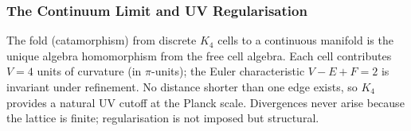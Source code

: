 \documentclass[11pt,a4paper]{book}
\begin{document}
\subsubsection*{The Continuum Limit and UV Regularisation}

The fold (catamorphism) from discrete $K_4$ cells to a continuous manifold
is the unique algebra homomorphism from the free cell algebra.  Each cell
contributes $V = 4$ units of curvature (in $\pi$-units); the Euler
characteristic $V - E + F = 2$ is invariant under refinement.  No distance
shorter than one edge exists, so $K_4$ provides a natural UV cutoff at the
Planck scale.  Divergences never arise because the lattice is finite;
regularisation is not imposed but structural.
\end{document}

